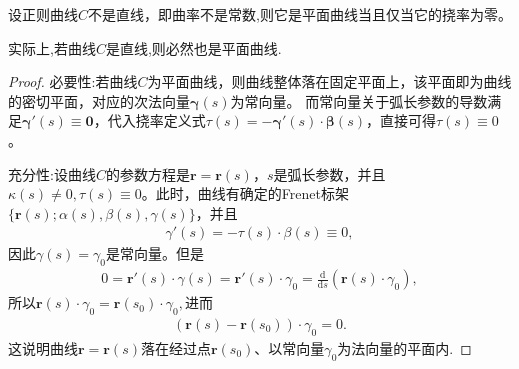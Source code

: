 \documentclass[../../main.tex]{subfiles}%
\begin{document}
\begin{theorem}\label{theorem:挠率为0等价于是平面曲线}
设正则曲线$C$不是直线，即曲率不是常数,则它是平面曲线当且仅当它的挠率为零。
\end{theorem}
\begin{remark}
实际上,若曲线$C$是直线,则必然也是平面曲线.
\end{remark}
\begin{proof}

{\heiti 必要性:}若曲线$C$为平面曲线，则曲线整体落在固定平面上，该平面即为曲线的密切平面，对应的次法向量$\bm{\gamma}(s)$为常向量。
而常向量关于弧长参数的导数满足$\bm{\gamma}'(s) \equiv \bm{0}$，代入挠率定义式$\tau(s) = -\bm{\gamma}'(s) \cdot \bm{\beta}(s)$，直接可得$\tau(s) \equiv 0$。

{\heiti 充分性:}设曲线$C$的参数方程是$\bm{r} = \bm{r}(s)$，$s$是弧长参数，并且$\kappa(s) \neq 0, \tau(s) \equiv 0$。此时，曲线有确定的Frenet标架$\{\bm{r}(s); \alpha(s), \beta(s), \gamma(s)\}$，并且
\begin{align*}
\gamma'(s) = -\tau(s) \cdot \beta(s) \equiv 0,
\end{align*}
因此$\gamma(s) = \gamma_0 $是常向量。但是
\begin{align*}
0 = \bm{r}'(s) \cdot \gamma(s) = \bm{r}'(s) \cdot \gamma_0 = \frac{\mathrm{d}}{\mathrm{d}s} (\bm{r}(s) \cdot \gamma_0),
\end{align*}
所以$\bm{r}(s) \cdot \gamma_0 = \bm{r}(s_0) \cdot \gamma_0,$进而
\begin{align*}
(\bm{r}(s) - \bm{r}(s_0)) \cdot \gamma_0 = 0.
\end{align*}
这说明曲线$\bm{r} = \bm{r}(s)$落在经过点$\bm{r}(s_0)$、以常向量$\gamma_0$为法向量的平面内.
\end{proof}
\end{document}
